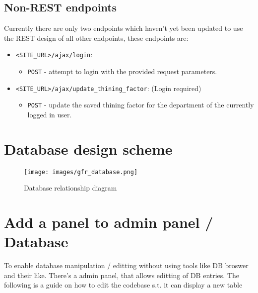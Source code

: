 \documentclass{article}
\begin{document}
\subsection{Non-REST endpoints}
Currently there are only two endpoints which haven't yet been updated to use the REST design of all other endpoints, these endpoints are:
\begin{itemize}
	\item \texttt{<SITE\_URL>/ajax/login}:
	\begin{itemize}
		\item \texttt{POST} - attempt to login with the provided request parameters.
	\end{itemize}

	\item \texttt{<SITE\_URL>/ajax/update\_thining\_factor}: (Login required)
	\begin{itemize}
		\item \texttt{POST} - update the saved thining factor for the department of the currently logged in user.
	\end{itemize}
\end{itemize}

\section{Database design scheme}
\begin{figure}[!htb]
	\centering
	\texttt{[image: images/gfr\_database.png]}
	\caption{Database relationship diagram}
\end{figure}

\newpage
\section{Add a panel to admin panel / Database}
To enable database manipulation / editting without using tools like DB broswer and their like. There's a admin panel, that allows editting of DB entries. The following is a guide on how to edit the codebase s.t. it can display a new table
\end{document}
